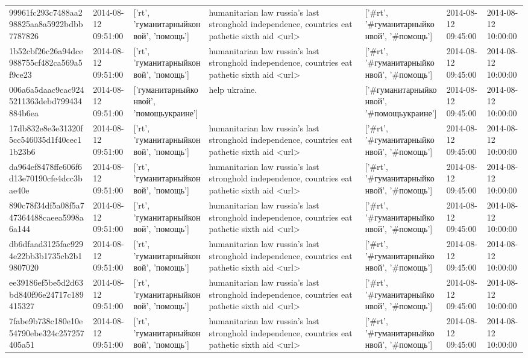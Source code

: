 \begin{tabular}{lllllll}
99961fc293c7488aa298825aa8a5922bdbb7787826 & 2014-08-12 09:51:00 & ['rt', 'гуманитарныйконвой', 'помощь'] & humanitarian law russia's last stronghold independence, countries eat pathetic sixth aid <url> & ['#rt', '#гуманитарныйконвой', '#помощь'] & 2014-08-12 09:45:00 & 2014-08-12 10:00:00 \\
1b52cbf26c26a94dce988755cf482ca569a5f9ce23 & 2014-08-12 09:51:00 & ['rt', 'гуманитарныйконвой', 'помощь'] & humanitarian law russia's last stronghold independence, countries eat pathetic sixth aid <url> & ['#rt', '#гуманитарныйконвой', '#помощь'] & 2014-08-12 09:45:00 & 2014-08-12 10:00:00 \\
006a6a5daac9cac9245211363debd799434884b6ea & 2014-08-12 09:51:00 & ['гуманитарныйконвой', 'помощьукраине'] & help ukraine. & ['#гуманитарныйконвой', '#помощьукраине'] & 2014-08-12 09:45:00 & 2014-08-12 10:00:00 \\
17db832e8e3e31320f5cc546035d1f40cec11b23b6 & 2014-08-12 09:51:00 & ['rt', 'гуманитарныйконвой', 'помощь'] & humanitarian law russia's last stronghold independence, countries eat pathetic sixth aid <url> & ['#rt', '#гуманитарныйконвой', '#помощь'] & 2014-08-12 09:45:00 & 2014-08-12 10:00:00 \\
da964ef8478ffe606f6d13e70190cfe4dcc3bae40e & 2014-08-12 09:51:00 & ['rt', 'гуманитарныйконвой', 'помощь'] & humanitarian law russia's last stronghold independence, countries eat pathetic sixth aid <url> & ['#rt', '#гуманитарныйконвой', '#помощь'] & 2014-08-12 09:45:00 & 2014-08-12 10:00:00 \\
890c78f34df5a08f5a747364488caeea5998a6a144 & 2014-08-12 09:51:00 & ['rt', 'гуманитарныйконвой', 'помощь'] & humanitarian law russia's last stronghold independence, countries eat pathetic sixth aid <url> & ['#rt', '#гуманитарныйконвой', '#помощь'] & 2014-08-12 09:45:00 & 2014-08-12 10:00:00 \\
db6dfaad3125fac9294e22bb3b1735cb2b19807020 & 2014-08-12 09:51:00 & ['rt', 'гуманитарныйконвой', 'помощь'] & humanitarian law russia's last stronghold independence, countries eat pathetic sixth aid <url> & ['#rt', '#гуманитарныйконвой', '#помощь'] & 2014-08-12 09:45:00 & 2014-08-12 10:00:00 \\
ee39186ef5be5d2d63bd840f96e24717c189415327 & 2014-08-12 09:51:00 & ['rt', 'гуманитарныйконвой', 'помощь'] & humanitarian law russia's last stronghold independence, countries eat pathetic sixth aid <url> & ['#rt', '#гуманитарныйконвой', '#помощь'] & 2014-08-12 09:45:00 & 2014-08-12 10:00:00 \\
7fabe9b738c180e10e54790ebe324c257257405a51 & 2014-08-12 09:51:00 & ['rt', 'гуманитарныйконвой', 'помощь'] & humanitarian law russia's last stronghold independence, countries eat pathetic sixth aid <url> & ['#rt', '#гуманитарныйконвой', '#помощь'] & 2014-08-12 09:45:00 & 2014-08-12 10:00:00 \\

\end{tabular}
